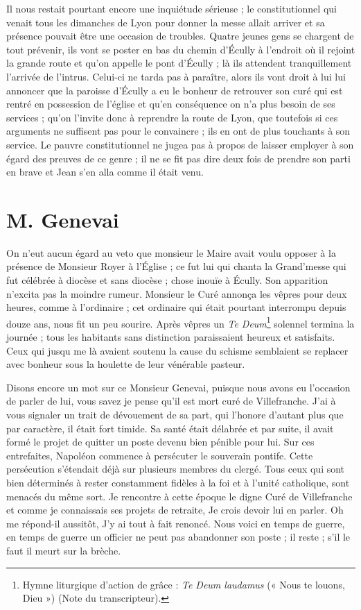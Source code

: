 \documentclass[11pt,a4paper]{report}
\begin{document}
Il nous restait pourtant encore une inquiétude sérieuse ; le constitutionnel qui venait tous les dimanches de Lyon pour donner la messe allait arriver et sa présence pouvait être une occasion de troubles. Quatre jeunes gens se chargent de tout prévenir, ils vont se poster en bas du chemin d'Écully à l'endroit où il rejoint la grande route et qu'on appelle le pont d'Écully ; là ils attendent tranquillement l'arrivée de l'intrus. Celui-ci ne tarda pas à paraître, alors ils vont droit à lui lui annoncer que la paroisse d'Écully a eu le bonheur de retrouver son curé qui est rentré en possession de l'église et qu'en conséquence on n'a plus besoin de ses services ; qu'on l'invite donc à reprendre la route de Lyon, que toutefois si ces arguments ne suffisent pas pour le convaincre ; ils en ont de plus touchants à son service. Le pauvre constitutionnel ne jugea pas à propos de laisser employer à son égard des preuves de ce genre ; il ne se fit pas dire deux fois de prendre son parti en brave et Jean s'en alla comme il était venu.

\section*{M. Genevai}

On n'eut aucun égard au veto que monsieur le Maire avait voulu opposer à la présence de Monsieur Royer à l'Église ; ce fut lui qui chanta la Grand'messe qui fut célébrée à diocèse et sans diocèse ; chose inouïe à Écully. Son apparition n'excita pas la moindre rumeur. Monsieur le Curé annonça les vêpres pour deux heures, comme à l'ordinaire ; cet ordinaire qui était pourtant interrompu depuis douze ans, nous fit un peu sourire. Après vêpres un \textit{Te Deum}\footnote{Hymne liturgique d'action de grâce : \textit{Te Deum laudamus} (« Nous te louons, Dieu ») (Note du transcripteur).} solennel termina la journée ; tous les habitants sans distinction paraissaient heureux et satisfaits. Ceux qui jusqu me là avaient soutenu la cause du schisme semblaient se replacer avec bonheur sous la houlette de leur vénérable pasteur.

Disons encore un mot sur ce Monsieur Genevai, puisque nous avons eu l'occasion de parler de lui, vous savez je pense qu'il est mort curé de Villefranche. J'ai à vous signaler un trait de dévouement de sa part, qui l'honore d'autant plus que par caractère, il était fort timide. Sa santé était délabrée et par suite, il avait formé le projet de quitter un poste devenu bien pénible pour lui. Sur ces entrefaites, Napoléon commence à persécuter le souverain pontife. Cette persécution s'étendait déjà sur plusieurs membres du clergé. Tous ceux qui sont bien déterminés à rester constamment fidèles à la foi et à l'unité catholique, sont menacés du même sort. Je rencontre à cette époque le digne Curé de Villefranche et comme je connaissais ses projets de retraite, Je crois devoir lui en parler. Oh me répond-il aussitôt, J'y ai tout à fait renoncé. Nous voici en temps de guerre, en temps de guerre un officier ne peut pas abandonner son poste ; il reste ; s'il le faut il meurt sur la brèche.
\end{document}
